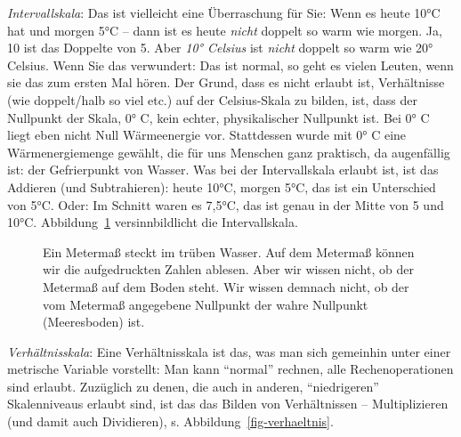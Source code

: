 \documentclass[
  letterpaper,
  twoside,
  open=any]{scrbook}
\theoremstyle{definition}
\theoremstyle{definition}
\theoremstyle{definition}
\theoremstyle{remark}
\begin{document}
\emph{Intervallskala}: Das ist vielleicht eine Überraschung für Sie:
Wenn es heute 10°C hat und morgen 5°C -- dann ist es heute \emph{nicht}
doppelt so warm wie morgen. Ja, 10 ist das Doppelte von 5. Aber
\emph{10° Celsius} ist \emph{nicht} doppelt so warm wie 20° Celsius.
Wenn Sie das verwundert: Das ist normal, so geht es vielen Leuten, wenn
sie das zum ersten Mal hören. Der Grund, dass es nicht erlaubt ist,
Verhältnisse (wie doppelt/halb so viel etc.) auf der Celsius-Skala zu
bilden, ist, dass der Nullpunkt der Skala, 0° C, kein echter,
physikalischer Nullpunkt ist. Bei 0° C liegt eben nicht Null
Wärmeenergie vor. Stattdessen wurde mit 0° C eine Wärmenergiemenge
gewählt, die für uns Menschen ganz praktisch, da augenfällig ist: der
Gefrierpunkt von Wasser. Was bei der Intervallskala erlaubt ist, ist das
Addieren (und Subtrahieren): heute 10°C, morgen 5°C, das ist ein
Unterschied von 5°C. Oder: Im Schnitt waren es 7,5°C, das ist genau in
der Mitte von 5 und 10°C. Abbildung~\ref{fig-intervall} versinnbildlicht
die Intervallskala.

\begin{figure}


\caption{\label{fig-intervall}Ein Metermaß steckt im trüben Wasser. Auf
dem Metermaß können wir die aufgedruckten Zahlen ablesen. Aber wir
wissen nicht, ob der Metermaß auf dem Boden steht. Wir wissen demnach
nicht, ob der vom Metermaß angegebene Nullpunkt der wahre Nullpunkt
(Meeresboden) ist.}

\end{figure}%

\emph{Verhältnisskala}: Eine Verhältnisskala ist das, was man sich
gemeinhin unter einer metrische Variable vorstellt: Man kann
\enquote{normal} rechnen, alle Rechenoperationen sind erlaubt. Zuzüglich
zu denen, die auch in anderen, \enquote{niedrigeren} Skalenniveaus
erlaubt sind, ist das das Bilden von Verhältnissen -- Multiplizieren
(und damit auch Dividieren), s. Abbildung~\ref{fig-verhaeltnis}.
\end{document}
